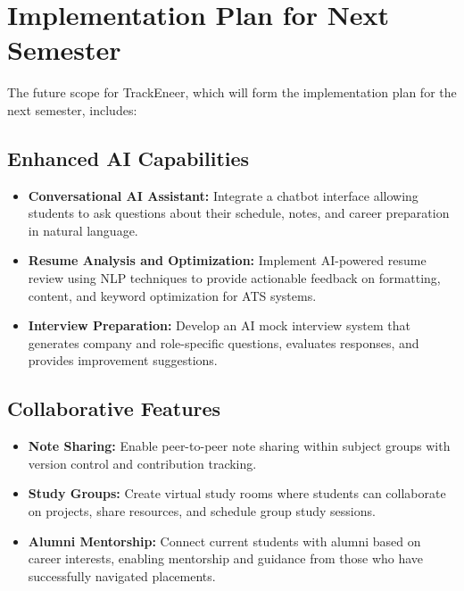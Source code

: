 \documentclass[12pt]{article}
\begin{document}
\section{Implementation Plan for Next Semester}
The future scope for TrackEneer, which will form the implementation plan for the next semester, includes:

\subsection{Enhanced AI Capabilities}
\begin{itemize}
    \item \textbf{Conversational AI Assistant:} Integrate a chatbot interface allowing students to ask questions about their schedule, notes, and career preparation in natural language.
    
    \item \textbf{Resume Analysis and Optimization:} Implement AI-powered resume review using NLP techniques to provide actionable feedback on formatting, content, and keyword optimization for ATS systems.
    
    \item \textbf{Interview Preparation:} Develop an AI mock interview system that generates company and role-specific questions, evaluates responses, and provides improvement suggestions.
\end{itemize}

\subsection{Collaborative Features}
\begin{itemize}
    \item \textbf{Note Sharing:} Enable peer-to-peer note sharing within subject groups with version control and contribution tracking.
    
    \item \textbf{Study Groups:} Create virtual study rooms where students can collaborate on projects, share resources, and schedule group study sessions.
    
    \item \textbf{Alumni Mentorship:} Connect current students with alumni based on career interests, enabling mentorship and guidance from those who have successfully navigated placements.
\end{itemize}
\end{document}
